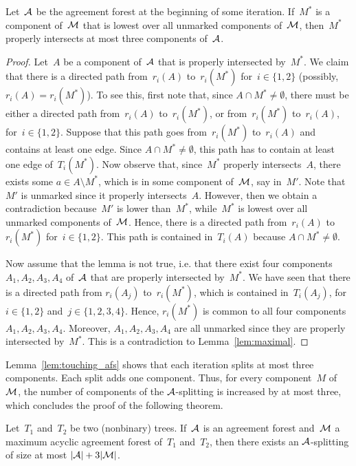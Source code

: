 \begin{lemma}
\label{lem:touching_afs}
Let~${\mathcal A}$ be the agreement forest at the beginning of some iteration. If~$M^*$ is a component of~${\mathcal M}$ that is lowest over all unmarked components of~${\mathcal M}$, then~$M^*$ properly intersects at most three components of~${\mathcal A}$.
\end{lemma}
\begin{proof}
Let~$A$ be a component of~${\mathcal A}$ that is properly intersected by~$M^*$. We claim that there is a directed path from~$r_i(A)$ to~$r_i(M^*)$ for~$i\in\{1,2\}$ (possibly, $r_i(A)=r_i(M^*)$). To see this, first note that, since $A\cap M^*\neq\emptyset$, there must be either a directed path from~$r_i(A)$ to~$r_i(M^*)$, or from~$r_i(M^*)$ to~$r_i(A)$, for~$i\in\{1,2\}$. Suppose that this path goes from~$r_i(M^*)$ to~$r_i(A)$ and contains at least one edge. Since $A\cap M^*\neq\emptyset$, this path has to contain at least one edge of~$T_i(M^*)$. Now observe that, since~$M^*$ properly intersects~$A$, there exists some $a\in A\setminus M^*$, which is in some component of~${\mathcal M}$, say in~$M'$. Note that~$M'$ is unmarked since it properly intersects~$A$. However, then we obtain a contradiction because~$M'$ is lower than~$M^*$, while~$M^*$ is lowest over all unmarked components of~${\mathcal M}$. Hence, there is a directed path from~$r_i(A)$ to~$r_i(M^*)$ for~$i\in\{1,2\}$. This path is contained in~$T_i(A)$ because $A\cap M^*\neq\emptyset$.

Now assume that the lemma is not true, i.e. that there exist four components $A_1,A_2,A_3,A_4$ of~${\mathcal A}$ that are properly intersected by~$M^*$. We have seen that there is a directed path from $r_i(A_j)$ to~$r_i(M^*)$, which is contained in~$T_i(A_j)$, for~$i\in\{1,2\}$ and~$j\in\{1,2,3,4\}$. Hence, $r_i(M^*)$ is common to all four components~$A_1,A_2,A_3,A_4$. Moreover, $A_1,A_2,A_3,A_4$ are all unmarked since they are properly intersected by~$M^*$. This is a contradiction to Lemma~\ref{lem:maximal}.
\end{proof}

Lemma~\ref{lem:touching_afs} shows that each iteration splits at most three components. Each split adds one component. Thus, for every component~$M$ of~${\mathcal M}$, the number of components of the ${\mathcal A}$-splitting is increased by at most three, which concludes the proof of the following theorem.

\begin{theorem}
\label{thm:3maaf} Let~$T_1$ and~$T_2$ be two (nonbinary) trees. If~${\mathcal A}$ is an agreement forest and~${\mathcal M}$ a maximum acyclic agreement forest of~$T_1$ and~$T_2$, then there exists an ${\mathcal A}$-splitting of size at most $|{\mathcal A}|+3|{\mathcal M}|$.
\end{theorem}

